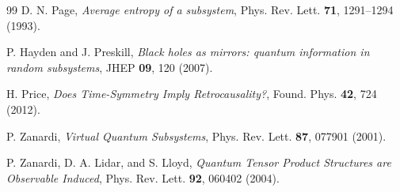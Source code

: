 \documentclass[12pt,a4paper]{article}
\begin{document}
\begin{thebibliography}{99}
D. N. Page, \emph{Average entropy of a subsystem}, Phys. Rev. Lett. \textbf{71}, 1291--1294 (1993).

P. Hayden and J. Preskill, \emph{Black holes as mirrors: quantum information in random subsystems}, JHEP \textbf{09}, 120 (2007).

H. Price, \emph{Does Time-Symmetry Imply Retrocausality?}, Found. Phys. \textbf{42}, 724 (2012).

P. Zanardi, \emph{Virtual Quantum Subsystems}, Phys. Rev. Lett. \textbf{87}, 077901 (2001).

P. Zanardi, D. A. Lidar, and S. Lloyd, \emph{Quantum Tensor Product Structures are Observable Induced}, Phys. Rev. Lett. \textbf{92}, 060402 (2004).

\end{thebibliography}
\end{document}
